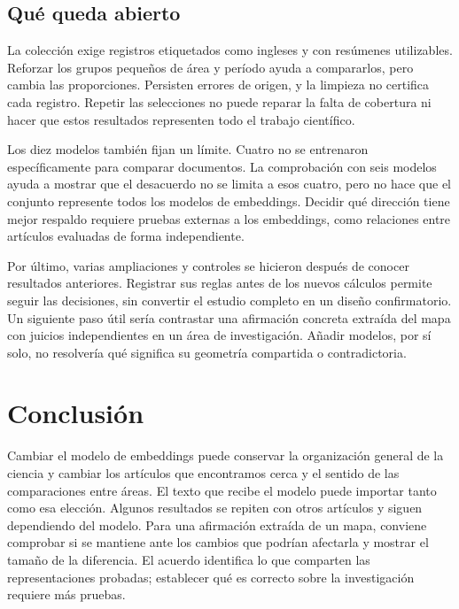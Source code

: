 \documentclass[12pt]{article}
\begin{document}
\subsection{Qué queda abierto}
La colección exige registros etiquetados como ingleses y con resúmenes utilizables. Reforzar los grupos pequeños de área y período ayuda a compararlos, pero cambia las proporciones. Persisten errores de origen, y la limpieza no certifica cada registro. Repetir las selecciones no puede reparar la falta de cobertura ni hacer que estos resultados representen todo el trabajo científico.

Los diez modelos también fijan un límite. Cuatro no se entrenaron específicamente para comparar documentos. La comprobación con seis modelos ayuda a mostrar que el desacuerdo no se limita a esos cuatro, pero no hace que el conjunto represente todos los modelos de embeddings. Decidir qué dirección tiene mejor respaldo requiere pruebas externas a los embeddings, como relaciones entre artículos evaluadas de forma independiente.

Por último, varias ampliaciones y controles se hicieron después de conocer resultados anteriores. Registrar sus reglas antes de los nuevos cálculos permite seguir las decisiones, sin convertir el estudio completo en un diseño confirmatorio. Un siguiente paso útil sería contrastar una afirmación concreta extraída del mapa con juicios independientes en un área de investigación. Añadir modelos, por sí solo, no resolvería qué significa su geometría compartida o contradictoria.

\section{Conclusión}
Cambiar el modelo de embeddings puede conservar la organización general de la ciencia y cambiar los artículos que encontramos cerca y el sentido de las comparaciones entre áreas. El texto que recibe el modelo puede importar tanto como esa elección. Algunos resultados se repiten con otros artículos y siguen dependiendo del modelo. Para una afirmación extraída de un mapa, conviene comprobar si se mantiene ante los cambios que podrían afectarla y mostrar el tamaño de la diferencia. El acuerdo identifica lo que comparten las representaciones probadas; establecer qué es correcto sobre la investigación requiere más pruebas.
\end{document}
